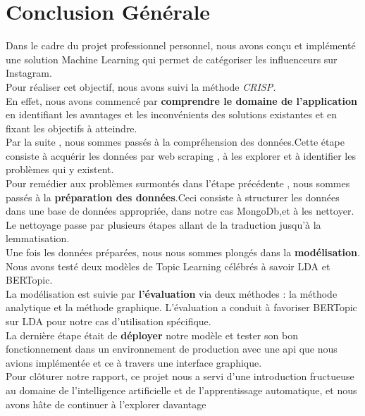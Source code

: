 \documentclass[12pt]{extarticle}
\begin{document}
\section{Conclusion Générale}
Dans le cadre du projet professionnel personnel, nous avons conçu et implémenté une solution Machine Learning  qui permet de catégoriser les influenceurs sur Instagram. \\
Pour réaliser cet objectif, nous avons suivi la méthode \textit{CRISP.}\\
En effet, nous avons commencé par\textbf{ comprendre le domaine de l'application} en identifiant   les  avantages et les inconvénients des solutions existantes  et en fixant les objectifs à atteindre.\\Par la suite , nous sommes passés à la compréhension des données.Cette étape consiste à acquérir les données par web scraping , à les explorer et à identifier les problèmes qui y existent.\\
Pour remédier aux problèmes surmontés dans l'étape précédente , nous sommes passés à la \textbf{préparation des données}.Ceci  consiste à structurer les données dans une base de données appropriée, dans notre cas MongoDb,et à les nettoyer. Le nettoyage passe par plusieurs étapes allant de la traduction jusqu'à la lemmatisation. \\
Une fois les données préparées, nous nous sommes plongés dans la\textbf{ modélisation}. Nous avons testé deux modèles de Topic Learning célébrés  à savoir LDA et BERTopic. \\
La modélisation est suivie par \textbf{l'évaluation} via deux méthodes : la méthode analytique et la méthode graphique. L'évaluation a conduit à favoriser BERTopic sur LDA pour notre cas d'utilisation spécifique. \\
La dernière étape était de\textbf{ déployer} notre modèle et tester son bon fonctionnement dans un environnement de production avec une api que nous avions implémentée et ce à travers une interface graphique.\\
Pour clôturer notre rapport, ce projet nous a servi d'une introduction fructueuse au domaine de l'intelligence artificielle et de l'apprentissage automatique, et nous avons hâte de continuer à l'explorer davantage
\clearpage

\printbibliography[heading=bibintoc,title=Bibliographie]
\end{document}

